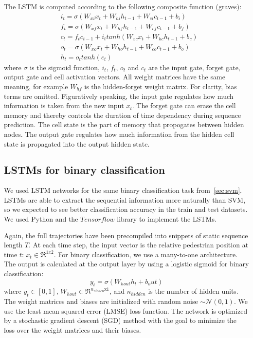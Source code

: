 The LSTM is computed according to the following composite function (graves):
\begin{equation}
\begin{aligned}
& i_t = \sigma(W_{xi}x_t + W_{hi}h_{t-1} + W_{ci}c_{t-1} + b_i)\\
& f_t = \sigma(W_{xf}x_t + W_{hf}h_{t-1} + W_{cf}c_{t-1} + b_f)\\
& c_t = f_tc_{t-1} + i_ttanh(W_{xc}x_t + W_{hc}h_{t-1} + b_c)\\
& o_t = \sigma(W_{xo}x_t + W_{ho}h_{t-1} + W_{co}c_{t-1} + b_o)\\
& h_t = o_ttanh(c_t)
\end{aligned}
\label{eq:lstm_eq} 
\end{equation}
where $\sigma$ is the sigmoid function, $i_t$, $f_t$, $o_t$ and $c_t$ are the input gate, forget gate, output gate and cell activation vectors.
All weight matrices have the same meaning, for example $W_{hf}$ is the hidden-forget weight matrix.
For clarity, bias terms are omitted.
Figuratively speaking, the input gate regulates how much information is taken from the new input $x_t$.
The forget gate can erase the cell memory and thereby controls the duration of time dependency during sequence prediction.
The cell state is the part of memory that propogates between hidden nodes.
The output gate regulates how much information from the hidden cell state is propagated into the output hidden state.

\subsection{LSTMs for binary classification}
We used LSTM networks for the same binary classification task from~\cref{sec:svm}.
LSTMs are able to extract the sequential information more naturally than SVM, so we expected to see better classification accuracy in the train and test datasets.
We used Python and the $\textit{Tensorflow}$ library to implement the LSTMs.

Again, the full trajectories have been precompiled into snippets of static sequence length $T$.
At each time step, the input vector is the relative pedestrian position at time $t$: $x_t \in \Re^{1x2}$.
For binary classification, we use a many-to-one architecture.
The output is calculated at the output layer by using a logistic sigmoid for binary classification:
\begin{equation}
y_t = \sigma(W_{hout}h_t + b_out)
\label{eq:bin_class_out} 
\end{equation}
where $y_t \in [0,1]$, $W_{hout} \in \Re^{n_{hidden} \text{x} 1}$, and $n_{hidden}$ is the number of hidden units.
The weight matrices and biases are initialized with random noise $\sim\mathcal{N}(0,1)$.
We use the least mean squared error (LMSE) loss function.
The network is optimized by a stochastic gradient descent (SGD) method with the goal to minimize the loss over the weight matrices and their biases.

